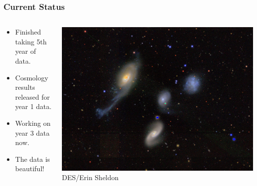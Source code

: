 \documentclass[aspectratio=169]{beamer}
\begin{document}
\frame
{

    \frametitle{Current Status}


    \begin{columns}
        \begin{column}{0.5\textwidth}
            \begin{itemize}

                \item Finished taking 5th year of data.

                \item Cosmology results released for year 1 data.

                \item Working on year 3 data now.

                \item The data is beautiful!

            \end{itemize}

        \end{column}
        \begin{column}{0.5\textwidth}
            \centering
                \includegraphics[width=\linewidth]{DES0022-4831-four.jpg}
                \newline
                {\tiny DES/Erin Sheldon}
        \end{column}

    \end{columns}


}
\end{document}
